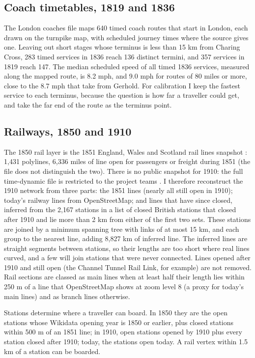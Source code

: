 \documentclass[11pt,a4paper]{article}
\begin{document}
\subsection{Coach timetables, 1819 and 1836}
The London coaches file \citep{rosevear2023coach} maps 640 timed coach routes that start in London, each drawn on the turnpike map, with scheduled journey times where the source gives one. Leaving out short stages whose terminus is less than 15 km from Charing Cross, 283 timed services in 1836 reach 136 distinct termini, and 357 services in 1819 reach 147. The median scheduled speed of all timed 1836 services, measured along the mapped route, is 8.2 mph, and 9.0 mph for routes of 80 miles or more, close to the 8.7 mph that \citet{alvarez2017} take from Gerhold. For calibration I keep the fastest service to each terminus, because the question is how far a traveller could get, and take the far end of the route as the terminus point.

\subsection{Railways, 1850 and 1910}
The 1850 rail layer is the 1851 England, Wales and Scotland rail lines snapshot \citep{satchell2023}: 1,431 polylines, 6,336 miles of line open for passengers or freight during 1851 (the file does not distinguish the two). There is no public snapshot for 1910: the full time-dynamic file is restricted to the project teams \citep{marti2017}. I therefore reconstruct the 1910 network from three parts: the 1851 lines (nearly all still open in 1910); today's railway lines from OpenStreetMap; and lines that have since closed, inferred from the 2,167 stations in a list of closed British stations that closed after 1910 and lie more than 2 km from either of the first two sets. These stations are joined by a minimum spanning tree with links of at most 15 km, and each group to the nearest line, adding 8,827 km of inferred line. The inferred lines are straight segments between stations, so their lengths are too short where real lines curved, and a few will join stations that were never connected. Lines opened after 1910 and still open (the Channel Tunnel Rail Link, for example) are not removed. Rail sections are classed as main lines when at least half their length lies within 250 m of a line that OpenStreetMap shows at zoom level 8 (a proxy for today's main lines) and as branch lines otherwise.

Stations determine where a traveller can board. In 1850 they are the open stations whose Wikidata opening year is 1850 or earlier, plus closed stations within 500 m of an 1851 line; in 1910, open stations opened by 1910 plus every station closed after 1910; today, the stations open today. A rail vertex within 1.5 km of a station can be boarded.
\end{document}
